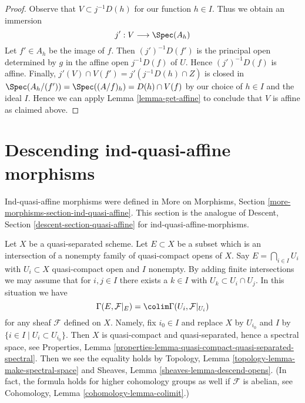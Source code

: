 \begin{proof}
\medskip\noindent
Observe that $V \subset j^{-1}D(h)$ for our function $h \in I$.
Thus we obtain an immersion
$$
j' : V \longrightarrow \Spec(A_h)
$$
Let $f' \in A_h$ be the image of $f$. Then $(j')^{-1}D(f')$
is the principal open determined by $g$ in the affine
open $j^{-1}D(f)$ of $U$.
Hence $(j')^{-1}D(f)$ is affine. Finally,
$j'(V) \cap V(f') = j'(j^{-1}D(h) \cap Z)$
is closed in $\Spec(A_h/(f')) = \Spec((A/f)_h) = D(h) \cap V(f)$
by our choice of $h \in I$ and the ideal $I$. Hence we can apply
Lemma \ref{lemma-get-affine}
to conclude that $V$ is affine as claimed above.
\end{proof}







\section{Descending ind-quasi-affine morphisms}
\label{section-ind-quasi-affine}

\noindent
Ind-quasi-affine morphisms were defined in
More on Morphisms, Section \ref{more-morphisms-section-ind-quasi-affine}.
This section is the analogue of
Descent, Section \ref{descent-section-quasi-affine}
for ind-quasi-affine-morphisms.

\medskip\noindent
Let $X$ be a quasi-separated scheme. Let $E \subset X$ be a subset
which is an intersection of a nonempty family of quasi-compact opens of $X$.
Say $E = \bigcap_{i \in I} U_i$ with $U_i \subset X$ quasi-compact open
and $I$ nonempty.
By adding finite intersections we may assume that for $i, j \in I$
there exists a $k \in I$ with $U_k \subset U_i \cap U_j$.
In this situation we have
\begin{equation}
\label{equation-sections-of-intersection}
\Gamma(E, \mathcal{F}|_E) = \colim \Gamma(U_i, \mathcal{F}|_{U_i})
\end{equation}
for any sheaf $\mathcal{F}$ defined on $X$. Namely, fix $i_0 \in I$
and replace $X$ by $U_{i_0}$ and $I$ by
$\{i \in I \mid U_i \subset U_{i_0}\}$. Then $X$ is quasi-compact
and quasi-separated, hence a spectral space, see
Properties, Lemma
\ref{properties-lemma-quasi-compact-quasi-separated-spectral}.
Then we see the equality holds by
Topology, Lemma \ref{topology-lemma-make-spectral-space} and
Sheaves, Lemma \ref{sheaves-lemma-descend-opens}.
(In fact, the formula holds for higher cohomology groups
as well if $\mathcal{F}$ is abelian, see
Cohomology, Lemma \ref{cohomology-lemma-colimit}.)

